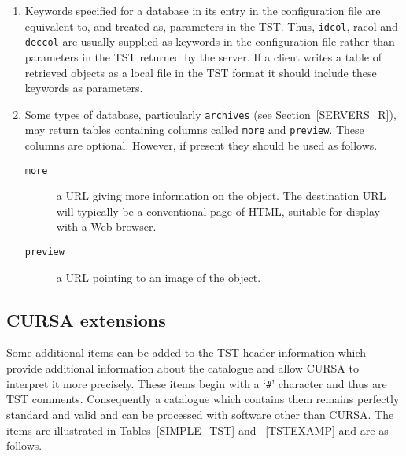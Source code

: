 \documentclass[twoside,11pt]{article}
\newcommand{\xref}[3]{#1}
\renewcommand{\_}{\texttt{\symbol{95}}}
\begin{document}
\begin{enumerate}

  \item Keywords specified for a database in its entry in the configuration
   file are equivalent to, and treated as, parameters in the TST.  Thus,
   {\tt id\_col}, {ra\_col} and {\tt dec\_col} are usually supplied as
   keywords in the configuration file rather than parameters in the TST
   returned by the server.  If a client writes a table of retrieved objects
   as a local file in the TST format it should include these keywords as
   parameters.

  \item Some types of database, particularly {\tt archives} (see
   Section~\ref{SERVERS_R}), may return tables containing columns called
   {\tt more} and {\tt preview}.  These columns are optional.  However, if
   present they should be used as follows.

  \begin{description}

    \item[{\tt more}] a URL giving more information on the object.  The
     destination URL will typically be a conventional page of HTML,
     suitable for display with a Web browser.

    \item[{\tt preview}] a URL pointing to an image of the object.

  \end{description}

\end{enumerate}

\subsection{\label{CURSA_R}CURSA extensions}

Some additional items can be added to the TST header information which
provide additional information about the catalogue and allow
\xref{CURSA}{sun190}{}\cite{SUN190} to interpret it more precisely.
These items begin with a `{\tt \#}' character and thus are TST comments.
Consequently a catalogue which contains them remains perfectly standard
and valid and can be processed with software other than CURSA.  The
items are illustrated in Tables~\ref{SIMPLE_TST} and ~\ref{TSTEXAMP}
and are as follows.
\end{document}
